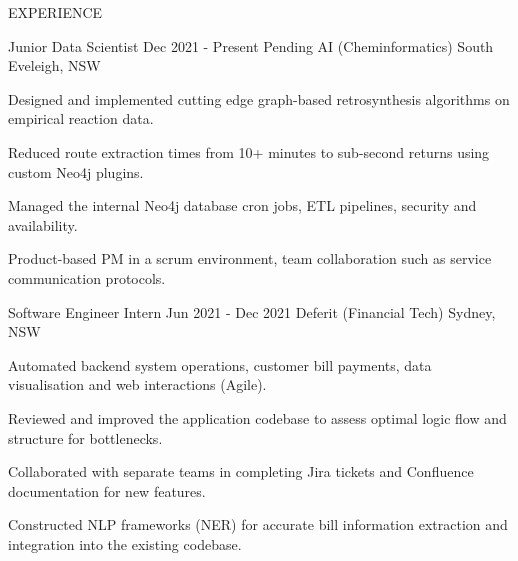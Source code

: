 
\begin{ResumeSection}{EXPERIENCE}

    \begin{DatedField}
        {Junior Data Scientist}
        {Dec 2021 - Present}
        {Pending AI (Cheminformatics)}
        {South Eveleigh, NSW}
        \item Designed and implemented cutting edge graph-based retrosynthesis algorithms on empirical reaction data.
        \item Reduced route extraction times from 10+ minutes to sub-second returns using custom Neo4j plugins.
        \item Managed the internal Neo4j database cron jobs, ETL pipelines, security and availability.
        \item Product-based PM in a scrum environment, team collaboration such as service communication protocols.
    \end{DatedField}
    
    \begin{DatedField}
        {Software Engineer Intern}
        {Jun 2021 - Dec 2021}
        {Deferit (Financial Tech)}
        {Sydney, NSW}
        \item Automated backend system operations, customer bill payments, data visualisation and web interactions (Agile).
        \item Reviewed and improved the application codebase to assess optimal logic flow and structure for bottlenecks.
        \item Collaborated with separate teams in completing Jira tickets and Confluence documentation for new features.
        \item Constructed NLP frameworks (NER) for accurate bill information extraction and integration into the existing codebase.
    \end{DatedField}

\end{ResumeSection} 